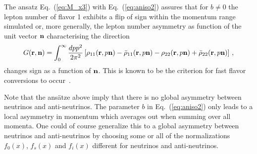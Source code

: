 \documentclass[prd,aps]{revtex4-2}
\begin{document}
The ansatz Eq.~(\ref{eq:M_x3}) with Eq.~(\ref{eq:aniso2}) assures that for $b\neq0$ the lepton number of flavor 1
exhibits a flip of sign within the momentum range simulated
or, more generally, the lepton number asymmetry as function of the unit vector ${\bf n}$ characterising the direction
\begin{equation}\label{eq:ELN}
  G({\bf r},{\bf n})=\int_0^\infty\frac{dpp^2}{2\pi^2}\left[\rho_{11}({\bf r},p{\bf n})-\bar\rho_{11}({\bf r},p{\bf n})
  -\rho_{22}({\bf r},p{\bf n})+\bar\rho_{22}({\bf r},p{\bf n})\right]\,,
\end{equation}
changes sign as a function of ${\bf n}$.
This is known to be the criterion for fast flavor conversions to occur~\cite{Izaguirre:2016gsx,Dasgupta:2021gfs}.

Note that the ansätze above imply that there is no global asymmetry between neutrinos and anti-neutrinos. The parameter
$b$ in Eq.~(\ref{eq:aniso2}) only leads to a local asymmetry in momentum which averages out when summing over all momenta.
One could of course generalize this to a global asymmetry between neutrinos and anti-neutrinos by choosing some or
all of the normalizations $f_0(x)$, $f_s(x)$ and $f_i(x)$ different for neutrinos and anti-neutrinos.
\end{document}

